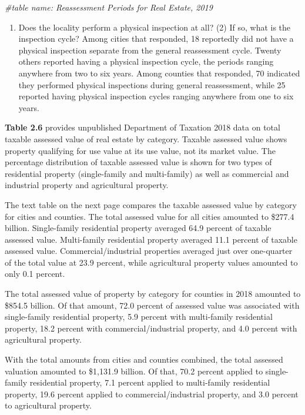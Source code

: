 \documentclass[
]{book}
\newenvironment{Shaded}{\begin{snugshade}}{\end{snugshade}}
\newcommand{\CommentTok}[1]{\textcolor[rgb]{0.56,0.35,0.01}{\textit{#1}}}
\providecommand{\tightlist}{%
  \setlength{\itemsep}{0pt}\setlength{\parskip}{0pt}}
\begin{document}
\begin{Shaded}
\begin{Highlighting}[]
\CommentTok{\#table name: Reassessment Periods for Real Estate, 2019}
\end{Highlighting}
\end{Shaded}

\begin{enumerate}
\def\labelenumi{(\arabic{enumi})}
\tightlist
\item
  Does the locality perform a physical inspection at all? (2) If so, what is the inspection cycle? Among cities that responded, 18 reportedly did not have a physical inspection separate from the general reassessment cycle. Twenty others reported having a physical inspection cycle, the periods ranging anywhere from two to six years. Among counties that responded, 70 indicated they performed physical inspections during general reassessment, while 25 reported having physical inspection cycles ranging anywhere from one to six years.
\end{enumerate}

\textbf{Table 2.6} provides unpublished Department of Taxation 2018 data on total taxable assessed value of real estate by category. Taxable assessed value shows property qualifying for use value at its use value, not its market value. The percentage distribution of taxable assessed value is shown for two types of residential property (single-family and multi-family) as well as commercial and industrial property and agricultural property.

The text table on the next page compares the taxable assessed value by category for cities and counties. The total assessed value for all cities amounted to \$277.4 billion. Single-family residential property averaged 64.9 percent of taxable assessed value. Multi-family residential property averaged 11.1 percent of taxable assessed value. Commercial/industrial properties averaged just over one-quarter of the total value at 23.9 percent, while agricultural property values amounted to only 0.1 percent.

The total assessed value of property by category for counties in 2018 amounted to \$854.5 billion. Of that amount, 72.0 percent of assessed value was associated with single-family residential property, 5.9 percent with multi-family residential property, 18.2 percent with commercial/industrial property, and 4.0 percent with agricultural property.

With the total amounts from cities and counties combined, the total assessed valuation amounted to \$1,131.9 billion. Of that, 70.2 percent applied to single-family residential property, 7.1 percent applied to multi-family residential property, 19.6 percent applied to commercial/industrial property, and 3.0 percent to agricultural property.
\end{document}
